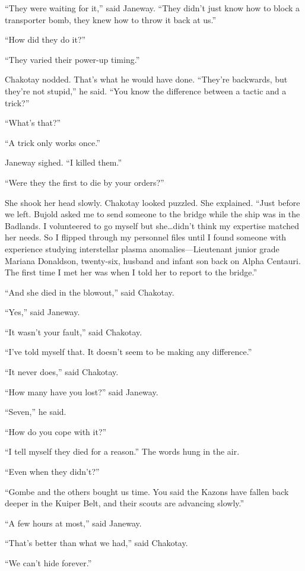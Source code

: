\documentclass[twoside,letterpaper,12pt]{memoir}
\begin{document}
``They were waiting for it,'' said Janeway. ``They didn't just know how to block a transporter bomb, they knew how to throw it back at us.''

``How did they do it?''

``They varied their power-up timing.''

Chakotay nodded. That's what he would have done. ``They're backwards, but they're not stupid,'' he said. ``You know the difference between a tactic and a trick?''

``What's that?''

``A trick only works once.''

Janeway sighed. ``I killed them.''

``Were they the first to die by your orders?''

She shook her head slowly. Chakotay looked puzzled. She explained. ``Just before we left. Bujold asked me to send someone to the bridge while the ship was in the Badlands. I volunteered to go myself but she\ldots didn't think my expertise matched her needs. So I flipped through my personnel files until I found someone with experience studying interstellar plasma anomalies—Lieutenant junior grade Mariana Donaldson, twenty-six, husband and infant son back on Alpha Centauri. The first time I met her was when I told her to report to the bridge.''

``And she died in the blowout,'' said Chakotay.

``Yes,'' said Janeway.

``It wasn't your fault,'' said Chakotay.

``I've told myself that. It doesn't seem to be making any difference.''

``It never does,'' said Chakotay.

``How many have you lost?'' said Janeway.

``Seven,'' he said.

``How do you cope with it?''

``I tell myself they died for a reason.'' The words hung in the air.

``Even when they didn't?''

``Gombe and the others bought us time. You said the Kazons have fallen back deeper in the Kuiper Belt, and their scouts are advancing slowly.''

``A few hours at most,'' said Janeway.

``That's better than what we had,'' said Chakotay.

``We can't hide forever.''
\end{document}
